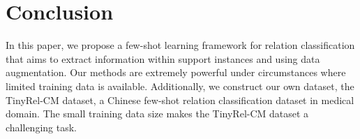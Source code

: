 \section{Conclusion}
In this paper, we propose a few-shot learning framework for relation classification that aims to extract information within support instances and using data augmentation. Our methods are extremely powerful under circumstances where limited training data is available.
Additionally, we construct our own dataset, the TinyRel-CM dataset, a Chinese few-shot relation classification dataset in medical domain. The small training data size makes the TinyRel-CM dataset a challenging task.
